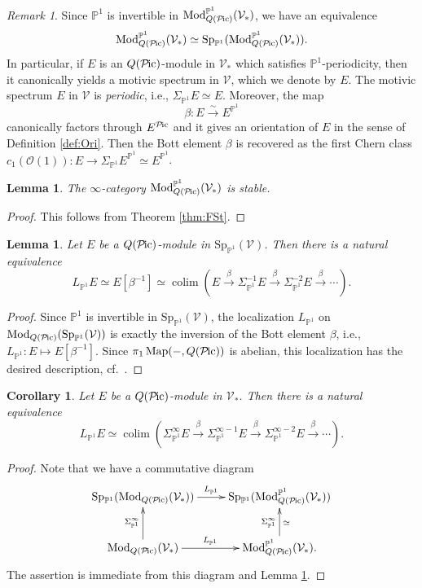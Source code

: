 \documentclass{amsart}
\theoremstyle{plain}
\newtheorem{lemma}[theorem]{Lemma}
\newtheorem{corollary}[theorem]{Corollary}
\theoremstyle{definition}
\theoremstyle{remark}
\newtheorem{remark}[theorem]{Remark}
\numberwithin{equation}{theorem}
\newcommand{\mcal}[1]{\mathcal{#1}}
\newcommand{\mbb}[1]{\mathbb{#1}}
\newcommand{\Mod}{\mathrm{Mod}}
\newcommand{\V}{\mathcal{V}}
\newcommand{\SigmaP}{\Sigma_{\mathbb{P}^1}}
\newcommand{\SpP}{\mathrm{Sp}_{\mathbb{P}^1}}
\newcommand{\Pic}{{\mathcal{P}\mspace{-2.0mu}\mathrm{ic}}}
\newcommand{\Map}{\operatorname{Map}}
\newcommand{\colim}{\operatorname*{colim}}
\begin{document}
\begin{remark}
Since $\mbb{P}^1$ is invertible in $\Mod_{Q(\Pic)}^{\mbb{P}^1}(\V_*)$, we have an equivalence
\[
	\Mod_{Q(\Pic)}^{\mbb{P}^1}(\V_*) \simeq \SpP(\Mod_{Q(\Pic)}^{\mbb{P}^1}(\V_*)).
\]
In particular, if $E$ is an $Q(\Pic)$-module in $\V_*$ which satisfies $\mbb{P}^1$-periodicity, then it canonically yields a motivic spectrum in $\V$, which we denote by $E$.
The motivic spectrum $E$ in $\V$ is \textit{periodic}, i.e., $\SigmaP E\simeq E$.
Moreover, the map
\[
	\beta \colon E \xrightarrow{\sim} E^{\mbb{P}^1}
\]
canonically factors through $E^\Pic$ and it gives an orientation of $E$ in the sense of Definition \ref{def:Ori}.
Then the Bott element $\beta$ is recovered as the first Chern class $c_1(\mcal{O}(1))\colon E\to \SigmaP E^{\mbb{P}^1}\simeq E^{\mbb{P}^1}$.
\end{remark}

\begin{lemma}\label{lem:Per}
The $\infty$-category $\Mod_{Q(\Pic)}^{\mbb{P}^1}(\V_*)$ is stable.
\end{lemma}
\begin{proof}
This follows from Theorem \ref{thm:FSt}.
\end{proof}

\begin{lemma}\label{lem:Per2}
Let $E$ be a $Q(\Pic)$-module in $\SpP(\V)$.
Then there is a natural equivalence
\[
	L_{\mbb{P}^1} E \simeq E[\beta^{-1}] \simeq \colim(E\xrightarrow{\beta}\SigmaP^{-1}E\xrightarrow{\beta}\SigmaP^{-2}E\xrightarrow{\beta}\cdots).
\] 
\end{lemma}
\begin{proof}
Since $\mbb{P}^1$ is invertible in $\SpP(\V)$, the localization $L_{\mbb{P}^1}$ on $\Mod_{Q(\Pic)}(\SpP(\V))$ is exactly the inversion of the Bott element $\beta$, i.e., $L_{\mbb{P}^1}\colon E\mapsto E[\beta^{-1}]$.
Since $\pi_1\Map(-,Q(\Pic))$ is abelian, this localization has the desired description, cf.\ \cite[Appendix C]{BNT}.
\end{proof}

\begin{corollary}\label{cor:Per}
Let $E$ be a $Q(\Pic)$-module in $\V_*$.
Then there is a natural equivalence
\[
	L_{\mbb{P}^1} E \simeq
	\colim(\SigmaP^\infty E\xrightarrow{\beta}\SigmaP^{\infty-1}E\xrightarrow{\beta}\SigmaP^{\infty-2}E\xrightarrow{\beta}\cdots).
\] 
\end{corollary}
\begin{proof}
Note that we have a commutative diagram
\[
\xymatrix{
	\SpP(\Mod_{Q(\Pic)}(\V_*)) \ar[r]^-{L_{\mbb{P}^1}} & \SpP(\Mod_{Q(\Pic)}^{\mbb{P}^1}(\V_*))  \\
	\Mod_{Q(\Pic)}(\V_*) \ar[r]^-{L_{\mbb{P}^1}} \ar[u]^{\SigmaP^\infty} & \Mod_{Q(\Pic)}^{\mbb{P}^1}(\V_*). \ar[u]^{\SigmaP^\infty}_\simeq
}
\]
The assertion is immediate from this diagram and Lemma \ref{lem:Per2}.
\end{proof}
\end{document}
